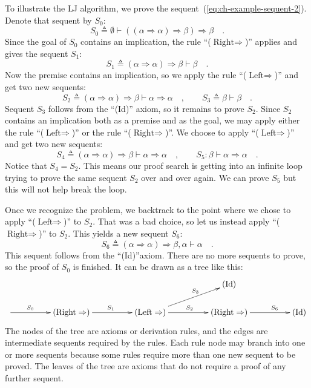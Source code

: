 To illustrate the LJ algorithm, we prove the sequent~(\ref{eq:ch-example-sequent-2}).
Denote that sequent by $S_{0}$:
\[
S_{0}\triangleq\emptyset\vdash\left(\left(\alpha\Rightarrow\alpha\right)\Rightarrow\beta\right)\Rightarrow\beta\quad.
\]
 Since the goal of $S_{0}$ contains an implication, the rule \textsf{``}($\text{Right}\Rightarrow$)\textsf{''}
applies and gives the sequent $S_{1}$:
\[
S_{1}\triangleq\left(\alpha\Rightarrow\alpha\right)\Rightarrow\beta\vdash\beta\quad.
\]
Now the premise contains an implication, so we apply the rule \textsf{``}($\text{Left}\Rightarrow$)\textsf{''}
and get two new sequents:
\[
S_{2}\triangleq\left(\alpha\Rightarrow\alpha\right)\Rightarrow\beta\vdash\alpha\Rightarrow\alpha\quad,\quad\quad S_{3}\triangleq\beta\vdash\beta\quad.
\]
Sequent $S_{3}$ follows from the \textsf{``}(Id)\textsf{''} axiom, so it remains
to prove $S_{2}$. Since $S_{2}$ contains an implication both as
a premise and as the goal, we may apply either the rule \textsf{``}($\text{Left}\Rightarrow$)\textsf{''}
or the rule \textsf{``}($\text{Right}\Rightarrow$)\textsf{''}. We choose to apply
\textsf{``}($\text{Left}\Rightarrow$)\textsf{''} and get two new sequents:
\[
S_{4}\triangleq\left(\alpha\Rightarrow\alpha\right)\Rightarrow\beta\vdash\alpha\Rightarrow\alpha\quad,\quad\quad S_{5}:\beta\vdash\alpha\Rightarrow\alpha\quad.
\]
Notice that $S_{4}=S_{2}$. This means our proof search is getting
into an infinite loop trying to prove the same sequent $S_{2}$ over
and over again. We can prove $S_{5}$ but this will not help break
the loop.

Once we recognize the problem, we backtrack to the point where we
chose to apply \textsf{``}($\text{Left}\Rightarrow$)\textsf{''} to $S_{2}$. That
was a bad choice, so let us instead apply \textsf{``}($\text{Right}\Rightarrow$)\textsf{''}
to $S_{2}$. This yields a new sequent $S_{6}$:
\[
S_{6}\triangleq\left(\alpha\Rightarrow\alpha\right)\Rightarrow\beta,\alpha\vdash\alpha\quad.
\]
This sequent follows from the \textsf{``}(Id)\textsf{''}axiom. There are no more sequents
to prove, so the proof of $S_{0}$ is finished. It can be drawn as
a tree like this:
\[
\xymatrix{\xyScaleY{1.5pc}\xyScaleX{4pc} &  &  & (\text{Id})\\
\ar[r]\sp(0.35){S_{0}} & (\text{Right}\Rightarrow)\ar[r]\sp(0.5){S_{1}} & (\text{Left}\Rightarrow)\ar[r]\sp(0.5){S_{2}}\ar[ru]\sp(0.6){S_{3}} & (\text{Right}\Rightarrow)\ar[r]\sp(0.65){S_{6}} & (\text{Id})
}
\]
The nodes of the tree are axioms or derivation rules, and the edges
are intermediate sequents required by the rules. Each rule node may
branch into one or more sequents because some rules require more than
one new sequent to be proved. The leaves of the tree are axioms that
do not require a proof of any further sequent. 

